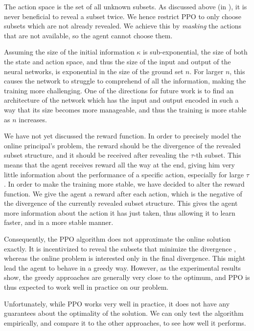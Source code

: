 The action space is the set of all unknown subsets.
As discussed above (in ), it is never beneficial to reveal a subset twice.
We hence restrict PPO to only choose subsets which are not already revealed.
We achieve this by \emph{masking} the actions that are not available, so the agent cannot choose them.

Assuming the size of the initial information $ \kappa $ is sub-exponential, the size of both the state and action space, and thus the size of the input and output of the neural networks, is exponential in the size of the ground set $ n $.
For larger $ n $, this causes the network to struggle to comprehend of all the information, making the training more challenging.
One of the directions for future work is to find an architecture of the network which has the input and output encoded in such a way that its size becomes more manageable, and thus the training is more stable as $ n $ increases.

We have not yet discussed the reward function.
In order to precisely model the online principal's problem, the reward should be the divergence of the revealed subset structure, and it should be received after revealing the $ \tau $-th subset.
This means that the agent receives reward all the way at the end, giving him very little information about the performance of a specific action, especially for large $ \tau $.
In order to make the training more stable, we have decided to alter the reward function.
We give the agent a reward after each action, which is the negative of the divergence of the currently revealed subset structure.
This gives the agent more information about the action it has just taken, thus allowing it to learn faster, and in a more stable manner.

Consequently, the PPO algorithm does not approximate the online solution exactly.
It is incentivized to reveal the subsets that minimize the divergence , whereas the online problem is interested only in the final divergence.
This might lead the agent to behave in a greedy way.
However, as the experimental results show, the greedy approaches are generally very close to the optimum, and PPO is thus expected to work well in practice on our problem.

Unfortunately, while PPO works very well in practice, it does not have any guarantees about the optimality of the solution.
We can only test the algorithm empirically, and compare it to the other approaches, to see how well it performs.
